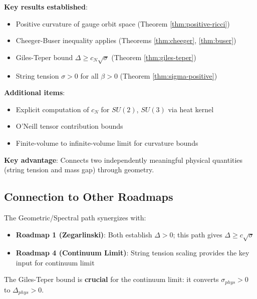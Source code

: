 \begin{summary}
\textbf{Key results established}:
\begin{itemize}
\item Positive curvature of gauge orbit space (Theorem \ref{thm:positive-ricci})
\item Cheeger-Buser inequality applies (Theorems \ref{thm:cheeger}, \ref{thm:buser})
\item Giles-Teper bound $\Delta \geq c_N\sqrt{\sigma}$ (Theorem \ref{thm:giles-teper})
\item String tension $\sigma > 0$ for all $\beta > 0$ (Theorem \ref{thm:sigma-positive})
\end{itemize}

\textbf{Additional items}:
\begin{itemize}
\item Explicit computation of $c_N$ for $SU(2)$, $SU(3)$ via heat kernel
\item O'Neill tensor contribution bounds
\item Finite-volume to infinite-volume limit for curvature bounds
\end{itemize}

\textbf{Key advantage}: Connects two independently meaningful physical quantities 
(string tension and mass gap) through geometry.
\end{summary}

\subsection{Connection to Other Roadmaps}

\begin{remark}[Synergy]
The Geometric/Spectral path synergizes with:
\begin{itemize}
\item \textbf{Roadmap 1 (Zegarlinski)}: Both establish $\Delta > 0$; this path 
      gives $\Delta \geq c\sqrt{\sigma}$
\item \textbf{Roadmap 4 (Continuum Limit)}: String tension scaling provides 
      the key input for continuum limit
\end{itemize}

The Giles-Teper bound is \textbf{crucial} for the continuum limit: it converts 
$\sigma_{phys} > 0$ to $\Delta_{phys} > 0$.
\end{remark}





